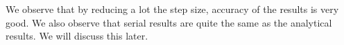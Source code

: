 \documentclass{article}
\begin{document}
                We observe that by reducing a lot the step size, accuracy of the results is very good. We also observe that serial
                results are quite the same as the analytical results. We will discuss this later.
            
    
\end{document}
